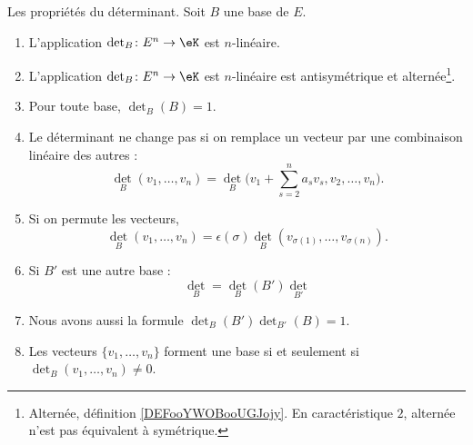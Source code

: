 \begin{lemma}     \label{LemJMWCooELZuho}
    Les propriétés du déterminant. Soit \( B\) une base de \( E\).
    \begin{enumerate}
        \item\label{ITEMooAHOHooDZgtSB}
            L'application \( \det_B\colon E^n\to \eK\) est \( n\)-linéaire.
        \item\label{ITEMooTXXBooBmDtzd}
            L'application \( \det_B\colon E^n\to \eK\) est \( n\)-linéaire est antisymétrique et alternée\footnote{Alternée, définition \ref{DEFooYWOBooUGJojy}. En caractéristique \( 2\), alternée n'est pas équivalent à symétrique.}.
        \item   \label{ITEMooNFJTooTqGoPr}
            Pour toute base, \( \det_B(B)=1\).
        \item   \label{ITEMooALRQooDvBzDQ}
            Le déterminant ne change pas si on remplace un vecteur par une combinaison linéaire des autres :
            \begin{equation}
                \det_B(v_1,\ldots, v_n)=\det_B\big( v_1+\sum_{s=2}^na_sv_s,v_2,\ldots, v_n \big).
            \end{equation}
        \item   \label{ITEMooQTTRooMbzqyW}
            Si on permute les vecteurs,
            \begin{equation}
                \det_B(v_1,\ldots, v_n)=\epsilon(\sigma)\det_B(v_{\sigma(1)},\ldots, v_{\sigma(n)}).
            \end{equation}
        \item   \label{ITEMooIPIDooTrerVF}
            Si \( B'\) est une autre base :
            \begin{equation}        \label{EqAWICooBLTTOY}
                \det_B=\det_B(B')\det_{B'}
            \end{equation}
        \item   \label{ITEMooXKTAooXynFTE}
            Nous avons aussi la formule \( \det_{B}(B')\det_{B'}(B)=1\).
        \item\label{ItemDWFLooDUePAf}
            Les vecteurs \( \{ v_1,\ldots, v_n \}\) forment une base si et seulement si \( \det_B(v_1,\ldots, v_n)\neq 0\).
    \end{enumerate}
\end{lemma}

